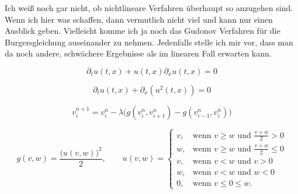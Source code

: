 Ich weiß noch gar nicht, ob nichtlineare Verfahren überhaupt so anzugehen sind.
Wenn ich hier was schaffen, dann vermutlich nicht viel und kann nur einen Ausblick geben.
Vielleicht komme ich ja noch das Gudonov Verfahren für die Burgersgleichung auseinander zu nehmen.
Jedenfalls stelle ich mir vor, dass man da noch andere, schwächere Ergebnisse als im linearen Fall erwarten kann.


\[ \partial_t u(t, x) + u(t,x) \partial_x u(t,x) = 0 \]

\[ \partial_t u(t, x) + \partial_x \left(u^2(t,x) \right) = 0 \]

\[ v^{n+1}_i = v^n_i - \lambda \bigl( g(v^n_i, v^n_{i+1}) - g(v^n_{i-1}, v^n_i) \bigr) \]

\[
g(v,w) = \frac{\bigl(u(v,w)\bigr)^2}{2}, \qquad u(v,w) = \begin{cases}
v, & \text{wenn } v \geq w \text{ und } \frac{v+w}{2} > 0\\
w, & \text{wenn } v \geq w \text{ und } \frac{v+w}{2} \leq 0\\
v, & \text{wenn } v < w \text{ und } v > 0\\
w, & \text{wenn } v < w \text{ und } w < 0\\
0, & \text{wenn } v \leq 0 \leq w.
\end{cases}
\]